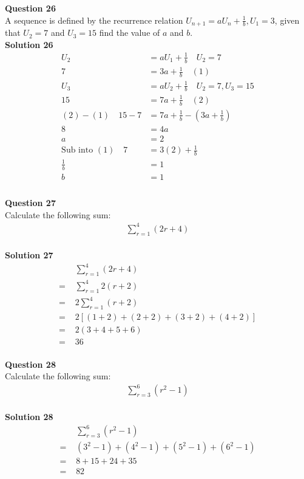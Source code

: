 \documentclass{article}
\begin{document}
\noindent\textbf{Question 26}\\[5pt]
A sequence is defined by the recurrence relation $U_{n+1}=aU_n+\displaystyle\frac{1}{b}, U_1=3$, given that $U_2=7$ and $U_3=15$ find the value of $a$ and $b$.\\[5pt]
\noindent\textbf{Solution 26}\\[5pt]
\begin{align*}
U_2&=aU_1+\displaystyle\frac{1}{b} \quad U_2=7\\[2pt]
7&=3a+\displaystyle\frac{1}{b}\quad (1)\\[12pt]
U_3&=aU_2+\displaystyle\frac{1}{b} \quad U_2=7,U_3=15\\[2pt]
15&=7a+\displaystyle\frac{1}{b}\quad (2)\\[12pt]
(2)-(1)\quad 15-7&=7a+\displaystyle\frac{1}{b}-\left(3a+\displaystyle\frac{1}{b}\right)\\[2pt]
8&=4a\\[2pt]
a&=2\\[2pt]
\text{Sub into}\,\, (1)\quad 7&=3(2)+\displaystyle\frac{1}{b}\\[2pt]
\displaystyle\frac{1}{b}&=1\\[2pt]
b&=1\\[2pt]
\end{align*}\\[10pt]

\noindent\textbf{Question 27}\\[5pt]
Calculate the following sum:
\begin{align*}
\sum_{r=1}^{4} (2r+4)
\end{align*}\\[5pt]
\noindent\textbf{Solution 27}\\[5pt]
\begin{align*}
&\sum_{r=1}^{4} (2r+4)\\[2pt]
=\,\,&\sum_{r=1}^{4} 2(r+2)\\[2pt]
=\,\,&2\sum_{r=1}^{4} (r+2)\\[2pt]
=\,\,&2[(1+2)+(2+2)+(3+2)+(4+2)]\\[2pt]
=\,\,&2(3+4+5+6)\\[2pt]
=\,\,&36
\end{align*}\\[10pt]

\noindent\textbf{Question 28}\\[5pt]
Calculate the following sum:
\begin{align*}
\sum_{r=3}^{6} (r^2-1)
\end{align*}\\[5pt]
\noindent\textbf{Solution 28}\\[5pt]
\begin{align*}
&\sum_{r=3}^{6} (r^2-1)\\[2pt]
=\,\,&(3^2-1)+(4^2-1)+(5^2-1)+(6^2-1)\\[2pt]
=\,\,&8+15+24+35\\[2pt]
=\,\,&82\\[-20pt]
\end{align*}\\[10pt]
\end{document}
